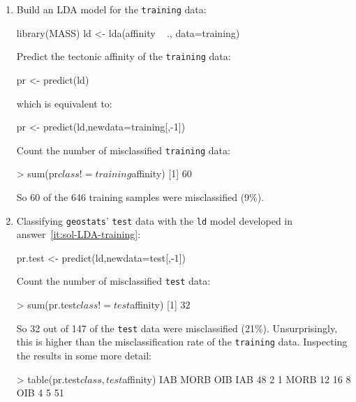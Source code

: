 \begin{enumerate}

\item\label{it:sol-LDA-training} Build an LDA model for the
  \texttt{training} data:

\begin{script}
library(MASS)
ld <- lda(affinity ~ ., data=training)
\end{script}

Predict the tectonic affinity of the \texttt{training} data:

\begin{script}[firstnumber=3]
pr <- predict(ld)
\end{script}

\noindent which is equivalent to:

\begin{script}[firstnumber=3]
pr <- predict(ld,newdata=training[,-1])
\end{script}

Count the number of misclassified \texttt{training} data:

\begin{console}
> sum(pr$class != training$affinity)
[1] 60
\end{console}

So 60 of the 646 training samples were misclassified (9\%).

\item\label{it:sol-LDA-test} Classifying \texttt{geostats}'
  \texttt{test} data with the \texttt{ld} model developed in
  answer~\ref{it:sol-LDA-training}:

\begin{script}[firstnumber=4]
pr.test <- predict(ld,newdata=test[,-1])
\end{script}

Count the number of misclassified \texttt{test} data:

\begin{console}
> sum(pr.test$class != test$affinity)
[1] 32
\end{console}

So 32 out of 147 of the \texttt{test} data were misclassified (21\%).
Unsurprisingly, this is higher than the misclassification rate of the
\texttt{training} data. Inspecting the results in some more detail:

\begin{console}
> table(pr.test$class,test$affinity)
       IAB MORB OIB
  IAB   48    2   1
  MORB  12   16   8
  OIB    4    5  51
\end{console}


\end{enumerate}
